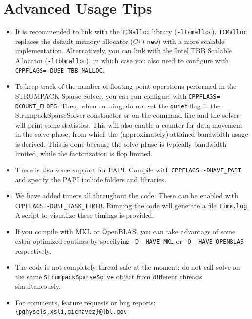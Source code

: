 \documentclass{article}
\newcommand{\tm}{\textsuperscript{\textregistered}}
\begin{document}
\section{Advanced Usage Tips}\label{sec:tips}
\begin{itemize}
\item It is recommended to link with the \texttt{TCMalloc} library
  (\lstinline[style=Bash]!-ltcmalloc!). \texttt{TCMalloc} replaces the
  default memory allocator (C\texttt{++} \texttt{new}) with a more
  scalable implementation. Alternatively, you can link with the
  Intel\tm{} TBB Scalable Allocator
  (\lstinline[style=Bash]!-ltbbmalloc!), in which case you also need
  to configure with \lstinline[style=Bash]!CPPFLAGS=-DUSE_TBB_MALLOC!.
\item To keep track of the number of floating point operations
  performed in the STRUMPACK Sparse Solver, you can run configure with
  \lstinline[style=Bash]!CPPFLAGS=-DCOUNT_FLOPS!. Then, when running,
  do not set the \texttt{quiet} flag in the StrumpackSparseSolver
  constructor or on the command line and the solver will print some
  statistics. This will also enable a counter for data movement in the
  solve phase, from which the (approximately) attained bandwidth usage
  is derived. This is done because the solve phase is typically
  bandwidth limited, while the factorization is flop limited.
\item There is also some support for PAPI. Compile with
  \lstinline[style=Bash]!CPPFLAGS=-DHAVE_PAPI! and specify the PAPI
  include folders and libraries.
\item We have added timers all throughout the code. These can be
  enabled with
  \lstinline[style=Bash]!CPPFLAGS=-DUSE_TASK_TIMER!. Running the code
  will generate a file \lstinline[style=Bash]!time.log!. A script to
  visualize these timings is provided.
\item If you compile with MKL or OpenBLAS, you can take advantage of
  some extra optimized routines by specifying
  \lstinline[style=Bash]!-D__HAVE_MKL!  or
  \lstinline[style=Bash]!-D__HAVE_OPENBLAS! respectively.
\item The code is not completely thread safe at the moment: do not
  call solve on the same \lstinline[style=C]!StrumpackSparseSolve!
  object from different threads simultaneously.
\item For comments, feature requests or bug reports:
  \texttt{\{pghysels,xsli,gichavez\}@lbl.gov}
\end{itemize}
\end{document}
